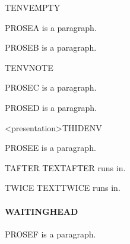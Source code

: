 \documentclass[a4paper]{memoir}
\begin{document}
\begin{frame}{TENVEMPTY}
\end{frame}

PROSEA is a paragraph.


PROSEB is a paragraph.

\begin{frame}{TENVNOTE}
\end{frame}

PROSEC is a paragraph.


PROSED is a paragraph.


\begin{frame}<presentation>{THIDENV}
\end{frame}


PROSEE is a paragraph.

\begin{frame}{TAFTER}
  TEXTAFTER runs in.
\end{frame}

\begin{frame}{TWICE}
  TEXTTWICE runs in.
  \paragraph*{WAITINGHEAD}
\end{frame}

PROSEF is a paragraph.
\end{document}

